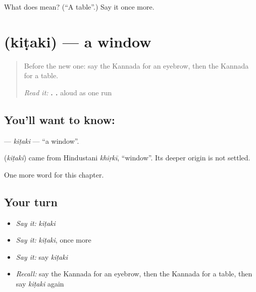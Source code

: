 \begin{tcolorbox}[breakable,colback=teal!4,colframe=teal!35!black,title={Before you move on}]
What does  mean? (\textquotedblleft{}A table\textquotedblright{}.) Say it once more.
\end{tcolorbox}
\section[\texorpdfstring{\kn{ಕಿಟಕಿ} (kiṭaki)}{ಕಿಟಕಿ (kiṭaki)}]{ (kiṭaki) — a window}

\label{lesson:KA-C137-kitaki}



\begin{quote}
Before the new one: say the Kannada for an eyebrow, then the Kannada for a table.

\emph{Read it:} \textbf{  .   .} aloud as one run
\end{quote}

\subsection*{You'll want to know: }
\textbf{} — \emph{kiṭaki} — \textquotedblleft{}a window\textquotedblright{}.

\begin{cousinweb}
\textbf{} (\emph{kiṭaki}) came from Hindustani \emph{khiṛkī}, \textquotedblleft{}window\textquotedblright{}. Its deeper origin is not settled.
\end{cousinweb}

\begin{grammarlens}[title={What you've built}]
One more word for this chapter.
\end{grammarlens}

\subsection*{Your turn}
\begin{itemize}
\raggedright
  \item \emph{Say it:} \emph{kiṭaki}
  \item \emph{Say it:} \emph{kiṭaki}, once more
  \item \emph{Say it:} say \emph{kiṭaki}
  \item \emph{Recall:} say the Kannada for an eyebrow, then the Kannada for a table, then say \emph{kiṭaki} again
\end{itemize}


